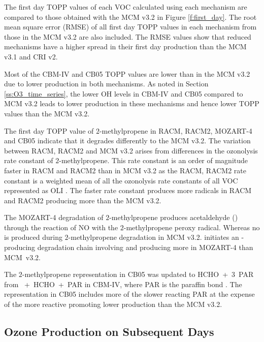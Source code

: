 The first day TOPP values of each VOC calculated using each mechanism are compared to those obtained with the MCM v3.{2} in Figure \ref{f:first_day}.
The root mean square error (RMSE) of all first day TOPP values in each mechanism from those in the MCM v3.2 are also included.
The RMSE values show that reduced mechanisms have a higher spread in their first day  production than the MCM v3.1 and CRI v2.

Most of the CBM-IV and CB05 TOPP values are lower than in the MCM v3.2 due to lower  production in both mechanisms.
As noted in Section \ref{ss:O3_time_series}, the lower OH levels in CBM-IV and CB05 compared to MCM v3.2 leads to lower  production in these mechanisms and hence lower TOPP values than the MCM v3.2.

The first day TOPP value of $2$-methylpropene in RACM, RACM2, MOZART-4 and CB05 indicate that it degrades differently to the MCM v3.2. 
The variation between RACM, RACM2 and MCM v3.2 arises from differences in the ozonolysis rate constant of $2$-methylpropene.
This rate constant is an order of magnitude faster in RACM and RACM2 than in MCM v3.2 as the RACM, RACM2 rate constant is a weighted mean of all the ozonolysis rate constants of all VOC represented as OLI \citep{Stockwell:1997, Goliff:2013}.
The faster rate constant produces more radicals in RACM and RACM2 producing more  than the MCM v3.2.

The MOZART-4 degradation of $2$-methylpropene produces acetaldehyde () through the reaction of NO with the $2$-methylpropene peroxy radical.
Whereas no  is produced during $2$-methylpropene degradation in MCM v3.2.
 initiates an -producing degradation chain involving  and  producing more  in MOZART-4 than \mbox{MCM v3.2}.

The $2$-methylpropene representation in CB05 was updated to \mbox{HCHO + $3$ PAR} from \mbox{ + HCHO + PAR} in CBM-IV, where PAR is the paraffin  bond \citep{Gery:1989, Yarwood:2005}.
The representation in CB05 includes more of the slower reacting PAR at the expense of the more reactive  promoting lower  production than the MCM v3.2.

\subsection{Ozone Production on Subsequent Days} \label{ss:profiles} %

